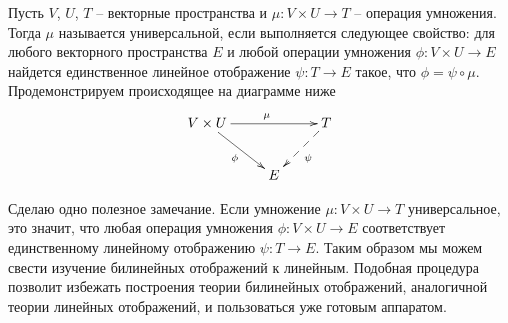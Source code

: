 \begin{definition}
Пусть $V$, $U$, $T$ -- векторные пространства и $\mu \colon V\times U \to T$ -- операция умножения.
Тогда $\mu$ называется универсальной, если выполняется следующее свойство: для любого векторного пространства $E$ и любой операции умножения $\phi \colon V\times U\to E$ найдется единственное линейное отображение $\psi\colon T\to E$ такое, что $\phi = \psi \circ \mu$.
Продемонстрируем происходящее на диаграмме ниже
\[
\xymatrix{
	{V\times U}\ar[rr]^{\mu}\ar[rd]_{\phi}&{}&{T}\ar@{-->}[dl]^{\psi}\\
	{}&{E}&{}
}
\]
\end{definition}
Сделаю одно полезное замечание.
Если умножение $\mu\colon V\times U\to T$ универсальное, это значит, что любая операция умножения $\phi \colon V\times U \to E$ соответствует единственному линейному отображению $\psi\colon T\to E$.
Таким образом мы можем свести изучение билинейных отображений к линейным.
Подобная процедура позволит избежать построения теории билинейных отображений, аналогичной теории линейных отображений, и пользоваться уже готовым аппаратом.


